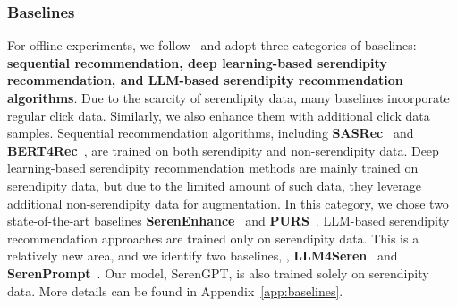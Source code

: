 
\subsubsection{Baselines}
For offline experiments, we follow~\cite{fu2024art} and adopt three categories of baselines: \textbf{sequential recommendation, deep learning-based serendipity recommendation, and LLM-based serendipity recommendation algorithms}. Due to the scarcity of serendipity data, many baselines incorporate regular click data. Similarly, we also enhance them with additional click data samples. Sequential recommendation algorithms, including \textbf{SASRec}~\cite{kang2018self} and \textbf{BERT4Rec}~\cite{sun2019bert4rec}, are trained on both serendipity and non-serendipity data. Deep learning-based serendipity recommendation methods are mainly trained on serendipity data, but due to the limited amount of such data, they leverage additional non-serendipity data for augmentation. In this category, we chose two state-of-the-art baselines \textbf{SerenEnhance}~\cite{fu2023wisdom} and  \textbf{PURS}~\cite{li2020purs}. LLM-based serendipity recommendation approaches are trained only on serendipity data. This is a relatively new area, and we identify two baselines, \ie, \textbf{LLM4Seren}~\cite{tokutake2024can} and \textbf{SerenPrompt}~\cite{fu2024art}. Our model, SerenGPT, is also trained solely on serendipity data. More details can be found in Appendix~\ref{app:baselines}.

 

